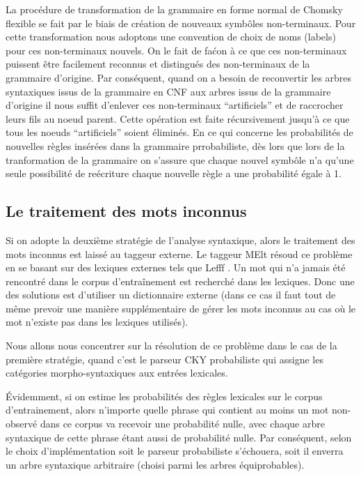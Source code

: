 \documentclass[12pt]{article}
\begin{document}
La proc\'edure de transformation de la grammaire en forme normal de Chomsky flexible
se fait par le biais de cr\'eation de nouveaux symb\^oles non-terminaux.
Pour cette transformation nous adoptons une convention de choix de noms (labels) pour ces non-terminaux
nouvels. On le fait de fa\'con \`a ce que ces non-terminaux puissent \^etre facilement reconnus et
distingu\'es des non-terminaux de la grammaire d'origine. Par cons\'equent, quand on a besoin de reconvertir
les arbres syntaxiques issus de la grammaire en CNF aux arbres issus de la grammaire d'origine il nous suffit
d'enlever ces non-terminaux ``artificiels'' et de raccrocher leurs fils au noeud parent. Cette op\'eration est
faite r\'ecursivement jusqu'\`a ce que tous les noeuds ``artificiels'' soient \'elimin\'es.
En ce qui concerne les probabilit\'es de nouvelles r\`egles ins\'er\'ees dans la grammaire prrobabiliste,
d\`es lors que lors de la tranformation de la grammaire on s'assure que chaque nouvel symb\^ole n'a qu'une
seule possibilit\'e de re\'ecriture chaque nouvelle r\`egle a une probabilit\'e \'egale \`a 1.

\subsection{Le traitement des mots inconnus}

Si on adopte la deuxi\`eme strat\'egie de l'analyse syntaxique, alors le
traitement des mots inconnus est laiss\'e au taggeur externe.
Le taggeur MElt r\'esoud ce probl\`eme en se basant sur des lexiques externes tels
que Lefff \cite{Lefff}. Un mot qui n'a jamais \'et\'e rencontr\'e dans le corpus
d'entra\^inement est recherch\'e dans les lexiques. Donc une des solutions est
d'utiliser un dictionnaire externe (dans ce cas il faut tout de m\^eme prevoir
une mani\`ere suppl\'ementaire de g\'erer les mots inconnus au cas o\`u le mot n'existe
pas dans les lexiques utilis\'es).\par

Nous allons nous concentrer sur la r\'esolution de ce probl\`eme dans le cas de la
premi\`ere strat\'egie, quand c'est le parseur CKY probabiliste qui assigne les
cat\'egories morpho-syntaxiques aux entr\'ees lexicales. \par

\'Evidemment, si on estime
les probabilit\'es des r\`egles lexicales sur le corpus d'entrainement, alors
n'importe quelle phrase qui contient au moins un mot non-observ\'e dans ce corpus
va recevoir une probabilit\'e nulle, avec chaque arbre syntaxique de cette phrase
\'etant aussi de probabilit\'e nulle. Par cons\'equent, selon le choix
d'impl\'ementation soit le parseur probabiliste s'\'echouera, soit il enverra un
arbre syntaxique arbitraire (choisi parmi les arbres \'equiprobables). \par
\end{document}

